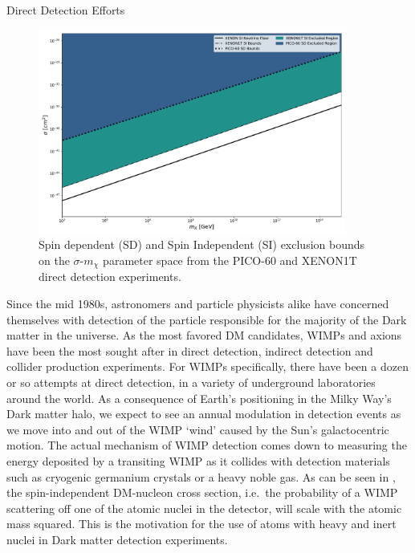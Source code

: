 \documentclass[a4paper,11pt]{article}
\begin{document}
\begin{section}{Direct Detection Efforts}
    \begin{figure}
        \centering
        \includegraphics[width=0.9\textwidth]{bounds.pdf}
        \caption{Spin dependent (SD) and Spin Independent (SI) exclusion bounds on the $\sigma$\--$m_\chi$ parameter space from the PICO-60 and XENON1T direct detection experiments.}
        \label{bounds}
    \end{figure}
    Since the mid 1980s, astronomers and particle physicists alike have concerned themselves with detection of the particle responsible for the majority of the Dark matter in the universe.
    As the most favored DM candidates, WIMPs and axions have been the most sought after in direct detection, indirect detection and collider production experiments.
    For WIMPs specifically, there have been a dozen or so attempts at direct detection, in a variety of underground laboratories around the world.
    As a consequence of Earth's positioning in the Milky Way's Dark matter halo, we expect to see an annual modulation in detection events as we move into and out of the WIMP `wind' caused by the Sun's galactocentric motion.
    The actual mechanism of WIMP detection comes down to measuring the energy deposited by a transiting WIMP as it collides with detection materials such as cryogenic germanium crystals or a heavy noble gas.
    As can be seen in \cite{Freese:2013}, the spin-independent DM-nucleon cross section, i.e.~the probability of a WIMP scattering off one of the atomic nuclei in the detector, will scale with the atomic mass squared.
    This is the motivation for the use of atoms with heavy and inert nuclei in Dark matter detection experiments.


\end{section}
\end{document}
